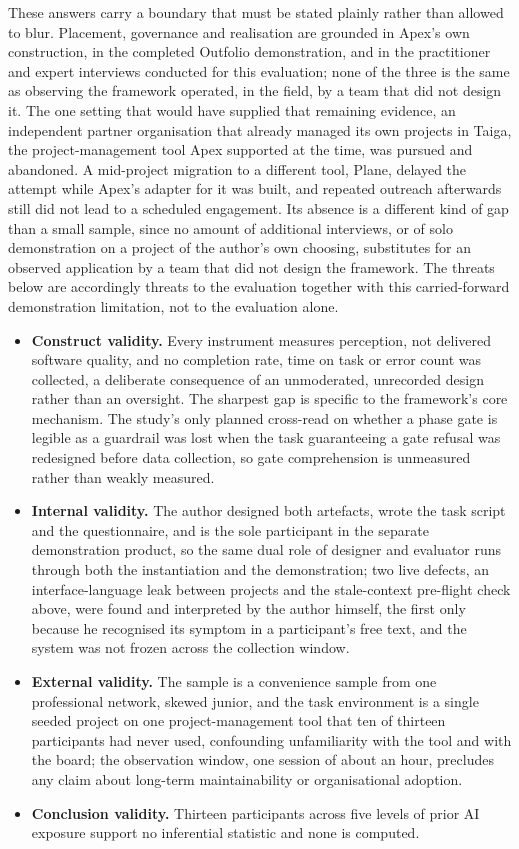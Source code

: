 \documentclass[sigconf,review=false]{acmart}
\begin{document}
These answers carry a boundary that must be stated plainly rather than allowed to blur. Placement, governance and realisation are grounded in Apex's own construction, in the completed Outfolio demonstration, and in the practitioner and expert interviews conducted for this evaluation; none of the three is the same as observing the framework operated, in the field, by a team that did not design it. The one setting that would have supplied that remaining evidence, an independent partner organisation that already managed its own projects in Taiga, the project-management tool Apex supported at the time, was pursued and abandoned. A mid-project migration to a different tool, Plane, delayed the attempt while Apex's adapter for it was built, and repeated outreach afterwards still did not lead to a scheduled engagement. Its absence is a different kind of gap than a small sample, since no amount of additional interviews, or of solo demonstration on a project of the author's own choosing, substitutes for an observed application by a team that did not design the framework. The threats below are accordingly threats to the evaluation together with this carried-forward demonstration limitation, not to the evaluation alone.

\begin{itemize}[leftmargin=0.5cm,itemsep=0.3em]
\item \textbf{Construct validity.} Every instrument measures perception, not delivered software quality, and no completion rate, time on task or error count was collected, a deliberate consequence of an unmoderated, unrecorded design rather than an oversight. The sharpest gap is specific to the framework's core mechanism. The study's only planned cross-read on whether a phase gate is legible as a guardrail was lost when the task guaranteeing a gate refusal was redesigned before data collection, so gate comprehension is unmeasured rather than weakly measured.
\item \textbf{Internal validity.} The author designed both artefacts, wrote the task script and the questionnaire, and is the sole participant in the separate demonstration product, so the same dual role of designer and evaluator runs through both the instantiation and the demonstration; two live defects, an interface-language leak between projects and the stale-context pre-flight check above, were found and interpreted by the author himself, the first only because he recognised its symptom in a participant's free text, and the system was not frozen across the collection window.
\item \textbf{External validity.} The sample is a convenience sample from one professional network, skewed junior, and the task environment is a single seeded project on one project-management tool that ten of thirteen participants had never used, confounding unfamiliarity with the tool and with the board; the observation window, one session of about an hour, precludes any claim about long-term maintainability or organisational adoption.
\item \textbf{Conclusion validity.} Thirteen participants across five levels of prior AI exposure support no inferential statistic and none is computed.
\end{itemize}
\end{document}
